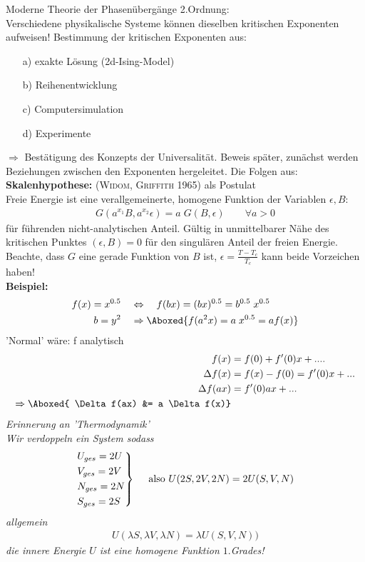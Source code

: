 \documentclass[12pt]{article}
\begin{document}
Moderne Theorie der Phasenübergänge 2.Ordnung: \\
Verschiedene physikalische Systeme können dieselben kritischen Exponenten aufweisen! %
Bestimmung der kritischen Exponenten aus:
\begin{enumerate}
\item[a)] exakte Lösung (2d-Ising-Model)
\item[b)]Reihenentwicklung
\item[c)]Computersimulation
\item[d)]Experimente
\end{enumerate}
$\Rightarrow$ Bestätigung des Konzepts der Universalität. Beweis später, zunächst werden Beziehungen zwischen den Exponenten hergeleitet. Die Folgen aus: \\
\textbf{Skalenhypothese:}  (\textsc{Widom, Griffith} 1965) als Postulat \\
Freie Energie ist eine verallgemeinerte, homogene Funktion der Variablen $\epsilon, B$:
 \begin{align}
G(a^{x_1} B, a^{x_2} \epsilon)= a \; G(B, \epsilon) \quad \quad \forall a > 0 \label{SkalenHypothese}
\end{align} 
für führenden nicht-analytischen Anteil. Gültig in unmittelbarer Nähe des kritischen Punktes $(\epsilon, B) =0$ für den singulären Anteil der freien Energie. Beachte, dass $G$ eine gerade Funktion von $B$ ist, $\epsilon = \frac{T-T_c}{T_c}$ kann beide Vorzeichen haben!\\
\textbf{Beispiel:}
\begin{align*}
f(x) = x^{0.5} \quad & \Leftrightarrow \quad f(bx) = (bx)^{0.5} = b^{0.5} \; x^{0.5} \\
b= y^2 \quad &\Rightarrow \Aboxed{ f(a^2 x) = a \; x^{0.5} = a f(x) }
\end{align*}
'Normal' wäre: f analytisch
\begin{align*}
f(x) &= f(0) + f'(0)x + .... \\
 \Delta f(x) &= f(x) - f(0) = f'(0)x+... \\
\Delta f(ax) &= f'(0) ax +... \\
\Rightarrow \Aboxed{ \Delta f(ax) &= a \Delta f(x)}
\end{align*} 
\textit{Erinnerung an 'Thermodynamik'} \\
\textit{Wir verdoppeln ein System sodass  %
\begin{align*}
\begin{rcases}
U_{ges}= 2U \\
V_{ges} = 2V \\
N_{ges} = 2N \\
S_{ges} = 2S 
\end{rcases}
\quad  \mbox{ also } U(2S, 2V, 2N) = 2 U (S,V,N)
\end{align*}
allgemein
\begin{align*}
U( \lambda S, \lambda V, \lambda N) = \lambda U(S,V,N))
\end{align*}
die innere Energie $U$ ist eine homogene Funktion $1.$Grades!} \\
\end{document}
